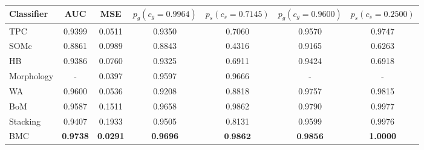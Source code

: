 \begin{tabular}{l c c c c c c}
  Classifier & AUC & MSE &
  $p_{g}\left(c_g=0.9964\right)$ & $p_{s}\left(c_s=0.7145\right)$ &
  $p_{g}\left(c_g=0.9600\right)$ & $p_{s}\left(c_s=0.2500\right)$ \\
  \hline
  TPC        & 0.9399 & 0.0511 & 0.9350 & 0.7060 & 0.9570 & 0.9747 \\
  SOMc       & 0.8861 & 0.0989 & 0.8843 & 0.4316 & 0.9165 & 0.6263 \\
  HB         & 0.9386 & 0.0760 & 0.9325 & 0.6911 & 0.9424 & 0.6918 \\
  Morphology & - & 0.0397 & 0.9597 & 0.9666 & - & - \\
  WA         & 0.9600 & 0.0536 & 0.9208 & 0.8818 & 0.9757 & 0.9815 \\
  BoM        & 0.9587 & 0.1511 & 0.9658 & 0.9862 & 0.9790 & 0.9977 \\
  Stacking   & 0.9407 & 0.1933 & 0.9505 & 0.8131 & 0.9599 & 0.9976 \\
  BMC        & \textbf{0.9738} & \textbf{0.0291} & \textbf{0.9696} & $\textbf{0.9862}$ & $\textbf{0.9856}$ & \textbf{1.0000} \\
\end{tabular}